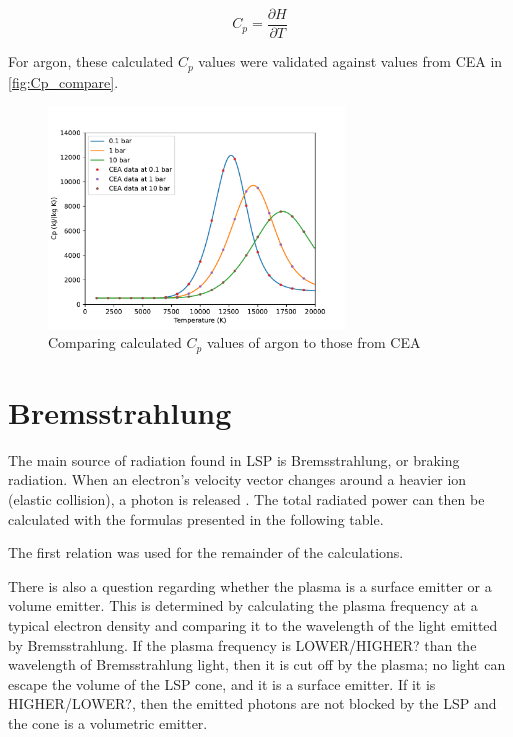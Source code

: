         \begin{equation}
            C_p = \frac{\partial H}{\partial T}
        \end{equation}
        
        For argon, these calculated $C_p$ values were validated against values from CEA \cite{CEARUNRev4} in \autoref{fig:Cp_compare}.
        
        \begin{figure}[!ht]
            \centering
            \includegraphics[width=0.7\textwidth]{assets/2 models/Cp_compare.pdf}
            \caption{Comparing calculated $C_p$ values of argon to those from CEA}
            \label{fig:Cp_compare}
        \end{figure}
    
    \section{Bremsstrahlung}
        
        The main source of radiation found in LSP is Bremsstrahlung, or braking radiation. When an electron's velocity vector changes around a heavier ion (elastic collision), a photon is released . The total radiated power can then be calculated with the formulas presented in the following table.

         \textcite{glasstoneControlledThermonuclearReactions1975}

        The first relation was used for the remainder of the calculations. 

        There is also a question regarding whether the plasma is a surface emitter or a volume emitter. This is determined by calculating the plasma frequency at a typical electron density and comparing it to the wavelength of the light emitted by Bremsstrahlung. If the plasma frequency is LOWER/HIGHER? than the wavelength of Bremsstrahlung light, then it is cut off by the plasma; no light can escape the volume of the LSP cone, and it is a surface emitter. If it is HIGHER/LOWER?, then the emitted photons are not blocked by the LSP and the cone is a volumetric emitter.
        
